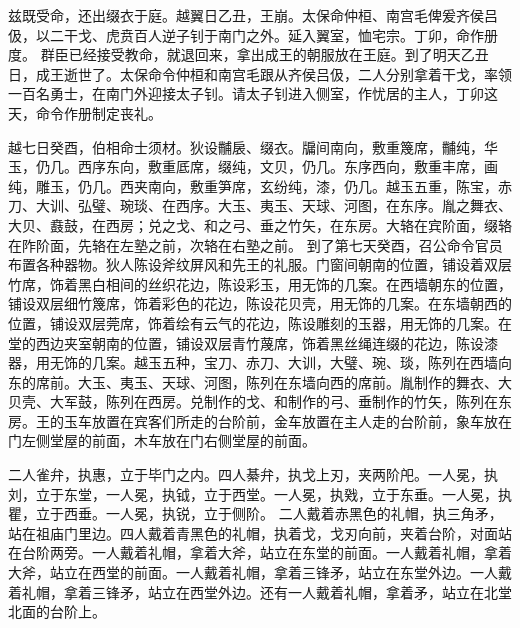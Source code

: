 \documentclass[12pt,UTF8]{ctexbook}
\begin{document}
兹既受命，还出缀衣于庭。越翼日乙丑，王崩。太保命仲桓、南宫毛俾爰齐侯吕伋，以二干戈、虎贲百人逆子钊于南门之外。延入翼室，恤宅宗。丁卯，命作册度。
群臣已经接受教命，就退回来，拿出成王的朝服放在王庭。到了明天乙丑日，成王逝世了。太保命令仲桓和南宫毛跟从齐侯吕伋，二人分别拿着干戈，率领一百名勇士，在南门外迎接太子钊。请太子钊进入侧室，作忧居的主人，丁卯这天，命令作册制定丧礼。

越七日癸酉，伯相命士须材。狄设黼扆、缀衣。牖间南向，敷重篾席，黼纯，华玉，仍几。西序东向，敷重厎席，缀纯，文贝，仍几。东序西向，敷重丰席，画纯，雕玉，仍几。西夹南向，敷重笋席，玄纷纯，漆，仍几。越玉五重，陈宝，赤刀、大训、弘璧、琬琰、在西序。大玉、夷玉、天球、河图，在东序。胤之舞衣、大贝、鼖鼓，在西房；兑之戈、和之弓、垂之竹矢，在东房。大辂在宾阶面，缀辂在阼阶面，先辂在左塾之前，次辂在右塾之前。
到了第七天癸酉，召公命令官员布置各种器物。狄人陈设斧纹屏风和先王的礼服。门窗间朝南的位置，铺设着双层竹席，饰着黑白相间的丝织花边，陈设彩玉，用无饰的几案。在西墙朝东的位置，铺设双层细竹篾席，饰着彩色的花边，陈设花贝壳，用无饰的几案。在东墙朝西的位置，铺设双层莞席，饰着绘有云气的花边，陈设雕刻的玉器，用无饰的几案。在堂的西边夹室朝南的位置，铺设双层青竹蔑席，饰着黑丝绳连缀的花边，陈设漆器，用无饰的几案。越玉五种，宝刀、赤刀、大训，大璧、琬、琰，陈列在西墙向东的席前。大玉、夷玉、天球、河图，陈列在东墙向西的席前。胤制作的舞衣、大贝壳、大军鼓，陈列在西房。兑制作的戈、和制作的弓、垂制作的竹矢，陈列在东房。王的玉车放置在宾客们所走的台阶前，金车放置在主人走的台阶前，象车放在门左侧堂屋的前面，木车放在门右侧堂屋的前面。

二人雀弁，执惠，立于毕门之内。四人綦弁，执戈上刃，夹两阶戺。一人冕，执刘，立于东堂，一人冕，执钺，立于西堂。一人冕，执戣，立于东垂。一人冕，执瞿，立于西垂。一人冕，执锐，立于侧阶。
二人戴着赤黑色的礼帽，执三角矛，站在祖庙门里边。四人戴着青黑色的礼帽，执着戈，戈刃向前，夹着台阶，对面站在台阶两旁。一人戴着礼帽，拿着大斧，站立在东堂的前面。一人戴着礼帽，拿着大斧，站立在西堂的前面。一人戴着礼帽，拿着三锋矛，站立在东堂外边。一人戴着礼帽，拿着三锋矛，站立在西堂外边。还有一人戴着礼帽，拿着矛，站立在北堂北面的台阶上。
\end{document}
